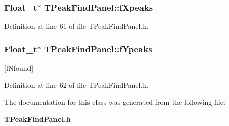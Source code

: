 \subsubsection[{fXpeaks}]{\setlength{\rightskip}{0pt plus 5cm}Float\_\-t$\ast$ {\bf TPeakFindPanel::fXpeaks}\hspace{0.3cm}{\ttfamily  [private]}}\label{classTPeakFindPanel_a608e0abc2668fdec2807029a3de23850}


Definition at line 61 of file TPeakFindPanel.h.
\subsubsection[{fYpeaks}]{\setlength{\rightskip}{0pt plus 5cm}Float\_\-t$\ast$ {\bf TPeakFindPanel::fYpeaks}\hspace{0.3cm}{\ttfamily  [private]}}\label{classTPeakFindPanel_aff0806bd79c6b606fdb13a3bced11359}


[fNfound] 

Definition at line 62 of file TPeakFindPanel.h.

The documentation for this class was generated from the following file:\begin{DoxyCompactItemize}
\item 
{\bf TPeakFindPanel.h}\end{DoxyCompactItemize}
